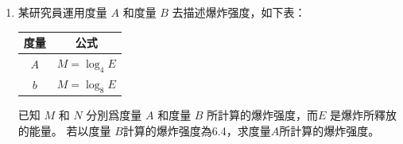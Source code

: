 \documentclass[11pt]{article}
\begin{document}
\begin{enumerate}
        \hrulefill
            
            \hrulefill
            
            \hrulefill
            
            \hrulefill
            
            \hrulefill
            
            \hrulefill
            
            \hrulefill
            
            \hrulefill
            
            \hrulefill
            
            \hrulefill

        \pagebreak
        \item 某研究員運用度量 $A$ 和度量 $B$ 去描述爆炸强度，如下表：
        \begin{center}
            \begin{tabular}{ |c|c| }
                \hline
                度量&公式\\
                \hline
                $A$&$M=\log_4{E}$\\
                \hline
                $b$&$M=\log_8{E}$\\
                \hline
            \end{tabular}
        \end{center}
        已知 $M$ 和 $N$ 分別爲度量 $A$ 和度量 $B$ 所計算的爆炸强度，而$E$ 是爆炸所釋放的能量。 若以度量 $B$計算的爆炸强度為6.4，求度量$A$所計算的爆炸强度。

        \hrulefill
            
            \hrulefill
            
            \hrulefill
            
            \hrulefill
            
            \hrulefill
            
            \hrulefill
            
            \hrulefill
            
            \hrulefill
            
            \hrulefill
            
            \hrulefill

            \hrulefill
            
            \hrulefill
            
            \hrulefill
            

\end{enumerate}
\end{document}
